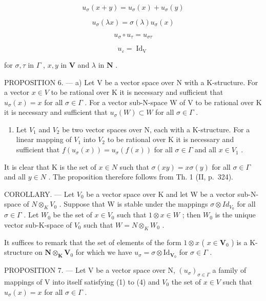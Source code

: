 \[
u _ {\sigma} (x + y) = u _ {\sigma} (x) + u _ {\sigma} (y)\tag{1}
\]

\[
u _ {\sigma} (\lambda x) = \sigma (\lambda) u _ {\sigma} (x)\tag{2}
\]

\[
u _ {\sigma} \circ u _ {\tau} = u _ {\sigma \tau}\tag{3}
\]

\[
u _ {\varepsilon} = \operatorname{Id} _ {\mathrm{V}}\tag{4}
\]

for \(\sigma, \tau\) in \(\Gamma\) , \(x, y\) in \(\mathbf{V}\) and \(\lambda\) in \(\mathbf{N}\) .

PROPOSITION 6. --- a) Let V be a vector space over N with a K-structure. For a vector \(x \in V\) to be rational over K it is necessary and sufficient that \(u_{\sigma}(x) = x\) for all \(\sigma \in \Gamma\) . For a vector sub-N-space W of V to be rational over K it is necessary and sufficient that \(u_{\sigma}(W) \subset W\) for all \(\sigma \in \Gamma\) .

\begin{enumerate}
\def\labelenumi{\alph{enumi})}
\setcounter{enumi}{1}
\tightlist
\item
  Let \(V_{1}\) and \(V_{2}\) be two vector spaces over N, each with a K-structure. For a linear mapping of \(V_{1}\) into \(V_{2}\) to be rational over K it is necessary and sufficient that \(f(u_{\sigma}(x)) = u_{\sigma}(f(x))\) for all \(\sigma \in \Gamma\) and all \(x \in V_{1}\) .
\end{enumerate}

It is clear that K is the set of \(x \in N\) such that \(\sigma(xy) = x\sigma(y)\) for all \(\sigma \in \Gamma\) and all \(y \in N\) . The proposition therefore follows from Th. 1 (II, p.~324).

COROLLARY. --- Let \(V_{0}\) be a vector space over K and let W be a vector sub-N-space of \(N \otimes_{K} V_{0}\) . Suppose that W is stable under the mappings \(\sigma \otimes Id_{V_{0}}\) for all \(\sigma \in \Gamma\) . Let \(W_{0}\) be the set of \(x \in V_{0}\) such that \(1 \otimes x \in W\) ; then \(W_{0}\) is the unique vector sub-K-space of \(V_{0}\) such that \(W = N \otimes_{K} W_{0}\) .

It suffices to remark that the set of elements of the form \(1 \otimes x\) ( \(x \in \mathbf{V}_0\) ) is a K-structure on \(\mathbf{N} \otimes_{\mathbf{K}} \mathbf{V}_0\) for which we have \(u_\sigma = \sigma \otimes \mathrm{Id}_{\mathbf{V}_0}\) for \(\sigma \in \Gamma\) .

PROPOSITION 7. --- Let V be a vector space over N, \((u_{\sigma})_{\sigma \in \Gamma}\) a family of mappings of V into itself satisfying (1) to (4) and \(V_{0}\) the set of \(x \in V\) such that \(u_{\sigma}(x) = x\) for all \(\sigma \in \Gamma\) .


